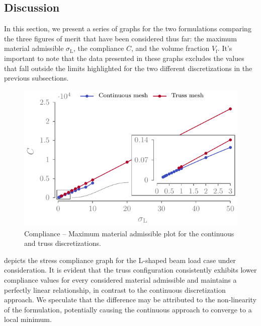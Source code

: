 \subsection{Discussion}
In this section, we present a series of graphs for the two formulations comparing the three figures of merit that have been considered thus far: the maximum material admissible $\sigma_\text{L}$, the compliance $C$, and the volume fraction $V_\text{f}$. It's important to note that the data presented in these graphs excludes the values that fall outside the limits highlighted for the two different discretizations in the previous subsections.
\begin{figure}
    \centering
    \includegraphics{figures/03_comparison_TO_TTO/14_stress_comp/stress_comp.pdf}
    \caption{Compliance -- Maximum material admissible plot for the continuous and truss discretizations.}
    \label{fig:03_stress_comp}
\end{figure}

 depicts the stress compliance graph for the L-shaped beam load case under consideration. It is evident that the truss configuration consistently exhibits lower compliance values for every considered material admissible and maintains a perfectly linear relationship, in contrast to the continuous discretization approach. We speculate that the difference may be attributed to the non-linearity of the formulation, potentially causing the continuous approach to converge to a local minimum.

